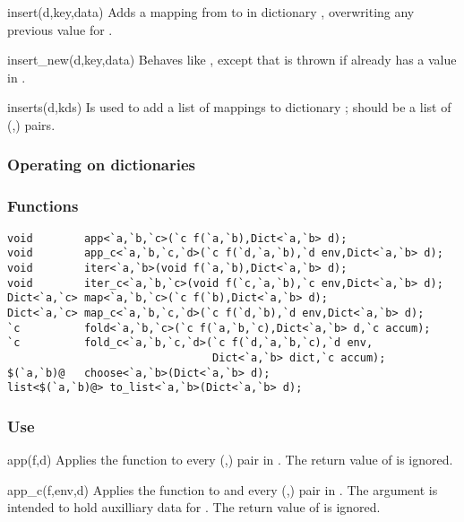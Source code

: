\begin{defun}{insert}{(d,key,data)}
Adds a mapping from  to  in dictionary ,
overwriting any previous value for .
\end{defun}

\begin{defun}{insert_new}{(d,key,data)}
Behaves like , except that  is thrown if
 already has a value in .
\end{defun}

\begin{defun}{inserts}{(d,kds)}
Is used to add a list of mappings to dictionary ; 
should be a list of (,) pairs.
\end{defun}

\subsubsection*{Operating on dictionaries}

\subsubsection*{Functions}
\begin{verbatim}
void        app<`a,`b,`c>(`c f(`a,`b),Dict<`a,`b> d);
void        app_c<`a,`b,`c,`d>(`c f(`d,`a,`b),`d env,Dict<`a,`b> d);
void        iter<`a,`b>(void f(`a,`b),Dict<`a,`b> d);
void        iter_c<`a,`b,`c>(void f(`c,`a,`b),`c env,Dict<`a,`b> d);
Dict<`a,`c> map<`a,`b,`c>(`c f(`b),Dict<`a,`b> d);
Dict<`a,`c> map_c<`a,`b,`c,`d>(`c f(`d,`b),`d env,Dict<`a,`b> d);
`c          fold<`a,`b,`c>(`c f(`a,`b,`c),Dict<`a,`b> d,`c accum);
`c          fold_c<`a,`b,`c,`d>(`c f(`d,`a,`b,`c),`d env,
                                Dict<`a,`b> dict,`c accum);
$(`a,`b)@   choose<`a,`b>(Dict<`a,`b> d);
list<$(`a,`b)@> to_list<`a,`b>(Dict<`a,`b> d);
\end{verbatim}

\subsubsection*{Use}

\begin{defun}{app}{(f,d)}
Applies the function  to every (,) pair in
.  The return value of  is ignored.
\end{defun}

\begin{defun}{app_c}{(f,env,d)}
Applies the function  to  and every
(,) pair in .  The argument  is
intended to hold auxilliary data for .  The return value of
 is ignored.
\end{defun}

